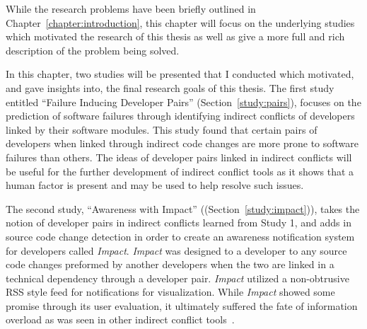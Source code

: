 \label{chapter:motivating}

\newlength{\savedunitlength}
\setlength{\unitlength}{2em}

While the research problems have been briefly outlined in Chapter~\ref{chapter:introduction}, this chapter
will focus on the underlying studies which motivated the research of this thesis as well as give a more full
and rich description of the problem being solved.

In this chapter, two studies will be presented that I conducted which motivated, and gave insights into, 
the final research goals
of this thesis. The first study entitled ``Failure Inducing Developer Pairs''
(Section~\ref{study:pairs}), focuses on the prediction of
software failures through identifying indirect conflicts of developers linked by their software modules. 
This study found that certain pairs of developers when linked through indirect code changes are more prone
to software failures than others. The ideas of developer pairs linked in indirect conflicts will be
useful for the further development of indirect conflict tools as it shows that a human factor is present
and may be used to help resolve such issues.

The second study, ``Awareness with Impact'' ((Section~\ref{study:impact})), 
takes the notion of developer
pairs in indirect conflicts learned from Study 1, and adds in source code change detection in order to create
an awareness notification system for developers called \textit{Impact}. \textit{Impact} was designed to a developer
to any source code changes preformed by another developers when the two are linked in a technical dependency through
a developer pair. \textit{Impact} utilized a non-obtrusive RSS style feed for notifications for visualization. 
While \textit{Impact} showed some promise through its user evaluation, it ultimately suffered the fate of information
overload as was seen in other indirect conflict tools~\cite{Sarma:2007:TSA,Servant:2010:CPI,Trainer:2005:BGT}.




\setlength{\unitlength}{\savedunitlength}
